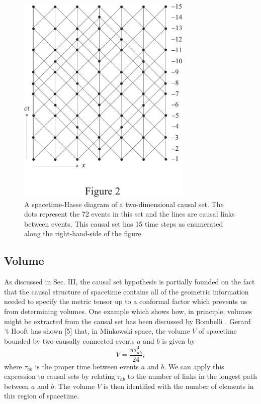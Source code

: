 \documentclass[aps,amssymb,12pt]{revtex4-2}
\begin{document}
\begin{figure}[tp]
\centerline{\includegraphics[height=4in]{figure2.pdf}}
\caption{A spacetime-Hasse diagram of a two-dimensional causal set.
The dots represent the 72 events in this set and the lines are causal links
between events. This causal set has 15 time steps as enumerated along the
right-hand-side of the figure.}
\end{figure}

\subsection{Volume}

As discussed in Sec. III, the causal set hypothesis is partially founded on
the fact that the causal structure of spacetime contains all of the
geometric information needed to specify the metric tensor up to a conformal
factor which prevents us from determining volumes. One example which shows
how, in principle, volumes might be extracted from the causal set has been
discussed by Bombelli \cite{28}. Gerard 't Hooft has shown [5] that, in Minkowski
space, the volume $V$ of spacetime bounded by two causally connected events $%
a$ and $b$ is given by
\begin{equation}
V=\frac{\pi \tau _{ab}^4}{24},  \label{4}
\end{equation}
where $\tau _{ab}$ is the proper time between events $a$ and $b$. We can
apply this expression to causal sets by relating $\tau _{ab}$ to the number
of links in the longest path between $a$ and $b$. The volume $V$ is then
identified with the number of elements in this region of spacetime.
\end{document}

